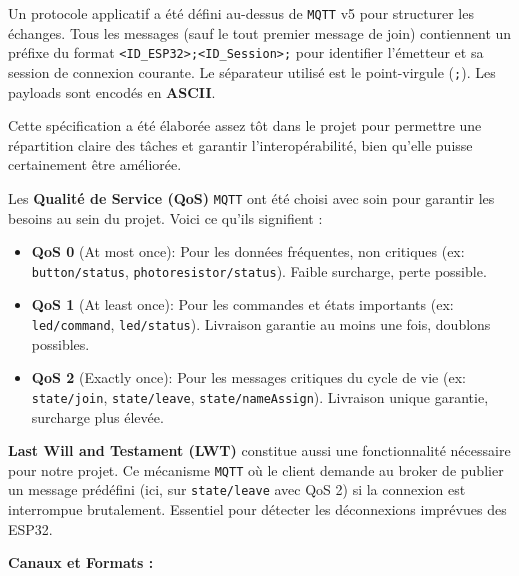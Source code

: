\documentclass[12pt]{article}
\begin{document}
Un protocole applicatif a été défini au-dessus de \texttt{MQTT} v5 pour structurer les échanges. Tous les messages (sauf le tout premier message de join) contiennent un préfixe du format \texttt{<ID\_ESP32>;<ID\_Session>;} pour identifier l'émetteur et sa session de connexion courante. Le séparateur utilisé est le point-virgule (\texttt{;}). Les payloads sont encodés en \textbf{ASCII}.

Cette spécification a été élaborée assez tôt dans le projet pour permettre une répartition claire des tâches et garantir l'interopérabilité, bien qu'elle puisse certainement être améliorée.

Les \textbf{Qualité de Service (QoS)} \texttt{MQTT} ont été choisi avec soin pour garantir les besoins au sein du
projet. Voici ce qu'ils signifient :
\begin{itemize}
    \item \textbf{QoS 0} (At most once): Pour les données fréquentes, non critiques (ex: \texttt{button/status}, \texttt{photoresistor/status}). Faible surcharge, perte possible.
    \item \textbf{QoS 1} (At least once): Pour les commandes et états importants (ex: \texttt{led/command}, \texttt{led/status}). Livraison garantie au moins une fois, doublons possibles.
    \item \textbf{QoS 2} (Exactly once): Pour les messages critiques du cycle de vie (ex: \texttt{state/join}, \texttt{state/leave}, \texttt{state/nameAssign}). Livraison unique garantie, surcharge plus élevée.
\end{itemize}

\textbf{Last Will and Testament (LWT)} constitue aussi une fonctionnalité nécessaire pour notre projet. Ce mécanisme \texttt{MQTT} où le client demande au broker de publier un message prédéfini (ici, sur \texttt{state/leave} avec QoS 2) si la connexion est interrompue brutalement. Essentiel pour détecter les déconnexions imprévues des ESP32.

\textbf{Canaux et Formats :}
\end{document}
